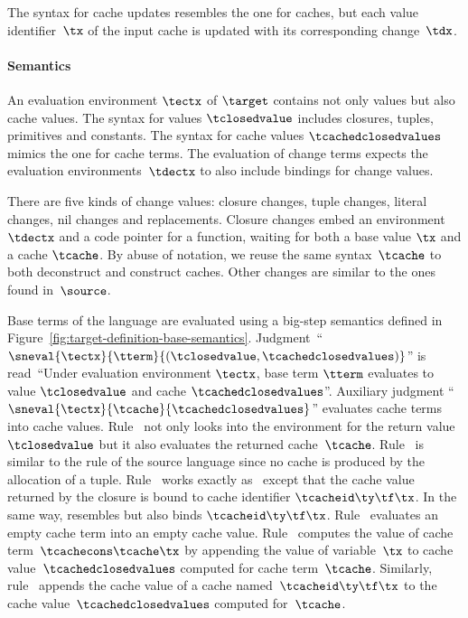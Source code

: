 The syntax for cache updates resembles the one for caches,
but each value identifier~$\tx$ of the input cache is updated with
its corresponding change~$\tdx$.

\paragraph{Semantics}
An evaluation environment $\tectx$ of $\target$ contains not only
values but also cache values. The syntax for values $\tclosedvalue$
includes closures, tuples, primitives and constants. The syntax for
cache values $\tcachedclosedvalues$ mimics the one for cache terms.
The evaluation of change terms expects the evaluation
environments~$\tdectx$ to also include bindings for change values.

There are five kinds of change values: closure changes, tuple changes,
literal changes, nil changes and replacements.  Closure changes embed
an environment $\tdectx$ and a code pointer for a function,
waiting for both a base value $\tx$ and a cache $\tcache$. By abuse of notation,
we reuse the same syntax~$\tcache$ to both deconstruct and
construct caches. Other changes are similar to the ones found
in~$\source$.

Base terms of the language are evaluated using a big-step
semantics defined in Figure~\ref{fig:target-definition-base-semantics}.
Judgment~``$\sneval{\tectx}{\tterm}{(\tclosedvalue,
  \tcachedclosedvalues)}$'' is read~``Under evaluation environment
$\tectx$, base term $\tterm$ evaluates to value
$\tclosedvalue$ and cache $\tcachedclosedvalues$''. Auxiliary
judgment ``$\sneval{\tectx}{\tcache}{\tcachedclosedvalues}$''
evaluates cache terms into cache values.
%
Rule~ not only looks into the environment
for the return value~$\tclosedvalue$ but it also evaluates
the returned cache~$\tcache$.
%
Rule~ is similar to the rule of the source
language since no cache is produced by the allocation of a tuple.
%
Rule~ works exactly
as~ except that the cache value returned by the
closure is bound to cache identifier $\tcacheid\ty\tf\tx$.
In the same way,  resembles 
but also binds $\tcacheid\ty\tf\tx$.
%
Rule~ evaluates an empty cache term into an
empty cache value. Rule~ computes the value of
cache term~$\tcachecons\tcache\tx$ by appending the value of
variable~$\tx$ to cache value~$\tcachedclosedvalues$ computed for
cache term~$\tcache$. Similarly,
rule~ appends the cache value of a cache
named~$\tcacheid\ty\tf\tx$ to the cache value~$\tcachedclosedvalues$
computed for~$\tcache$.

